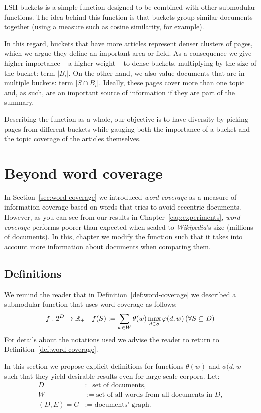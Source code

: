 \ac{LSH} buckets is a simple function designed to be combined with other
submodular functions. The idea behind this function is that buckets group
similar documents together (using a measure such as cosine similarity, for
example).

In this regard, buckets that have more articles represent denser clusters of
pages, which we argue they define an important area or field.
As a consequence we give higher importance -- a higher weight -- to dense
buckets, multiplying by the size of the bucket: term \(|B_i|\).
On the other hand, we also value documents that are in multiple buckets: term
\(|S \cap B_i|\).
Ideally, these pages cover more than one topic and, as such, are an important
source of information if they are part of the summary.

Describing the function as a whole, our objective is to have diversity by
picking pages from different buckets while gauging both the importance of a
bucket and the topic coverage of the articles themselves.

\section{Beyond word coverage}
\label{sec:word-coverage++}

In Section~\vref{sec:word-coverage} we introduced \emph{word coverage} as a
measure of information coverage based on words that tries to avoid eccentric
documents.
However, as you can see from our results in Chapter~\vref{cap:experiments},
\emph{word coverage} performs poorer than expected when scaled to
\emph{Wikipedia}'s size (millions of documents).
In this, chapter we modify the function such that it takes into account more
information about documents when comparing them.

\subsection{Definitions}

We remind the reader that in Definition~\vref{def:word-coverage} we described a
submodular function that uses word coverage as follows:
\begin{align*}
  &f : 2^D \to \mathbb{R}_+
  &f(S) := \sum_{w \in W} \theta(w) \max_{d \in S} \varphi(d, w)
  \,(\forall S \subseteq D)
\end{align*}
For details about the notations used we advise the reader to return to
Definition~\vref{def:word-coverage}.

In this section we propose explicit definitions for functions \(\theta(w)\) and
\(\phi(d, w\) such that they yield desirable results even for large-scale
corpora.
Let:
\begin{align*}
  D &:= \text{set of documents,} \\
  W &:= \text{set of all words from all documents in \(D\),} \\
  (D, E) = G &:= \text{ documents' graph.}
\end{align*}

